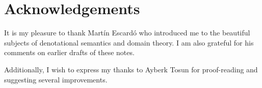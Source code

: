 \chapter{Acknowledgements}

It is my pleasure to thank Mart\'in Escard\'o who introduced me to the beautiful
subjects of denotational semantics and domain theory. I am also grateful for his
comments on earlier drafts of these notes.

Additionally, I wish to express my thanks to Ayberk Tosun for proof-reading and
suggesting several improvements.


